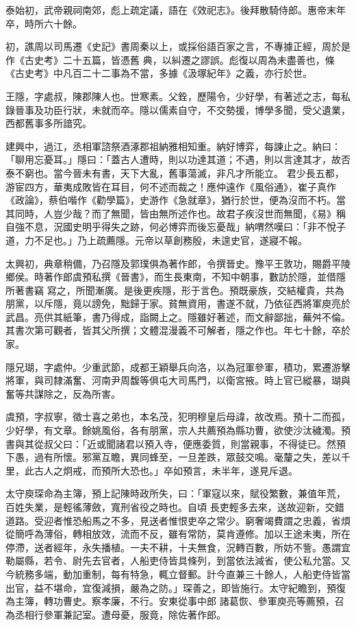 \begin{pinyinscope}
 泰始初，武帝親祠南郊，彪上疏定議，語在《效祀志》。後拜散騎侍郎。惠帝末年卒，時所六十餘。



 初，譙周以司馬遷《史記》書周秦以上，或採俗語百家之言，不專據正經，周於是作《古史考》二十五篇，皆憑舊
 典，以糾遷之謬誤。彪復以周為未盡善也，條《古史考》中凡百二十二事為不當，多據《汲塚紀年》之義，亦行於世。



 王隱，字處叔，陳郡陳人也。世寒素。父銓，歷陽令，少好學，有著述之志，每私錄晉事及功臣行狀，未就而卒。隱以儒素自守，不交勢援，博學多聞，受父遺業，西都舊事多所諳究。



 建興中，過江，丞相軍諮祭酒涿郡祖納雅相知重。納好博弈，每諫止之。納曰：「聊用忘憂耳。」隱曰：「蓋古人遭時，則以功達其道；不遇，則以言達其才，故否泰不窮也。當今晉未有書，天下大亂，舊事蕩滅，非凡才所能立。
 君少長五都，游宦四方，華夷成敗皆在耳目，何不述而裁之！應仲遠作《風俗通》，崔子真作《政論》，蔡伯喈作《勸學篇》，史游作《急就章》，猶行於世，便為沒而不朽。當其同時，人豈少哉？而了無聞，皆由無所述作也。故君子疾沒世而無聞，《易》稱自強不息，況國史明乎得失之跡，何必博弈而後忘憂哉」納喟然嘆曰：「非不悅子道，力不足也。」乃上疏薦隱。元帝以草創務殷，未遑史官，遂寢不報。



 太興初，典章稍備，乃召隱及郭璞俱為著作郎，令撰晉史。豫平王敦功，賜爵平陵鄉侯。時著作郎虞預私撰《晉書》，而生長東南，不知中朝事，數訪於隱，並借隱所著書竊
 寫之，所聞漸廣。是後更疾隱，形于言色。預既豪族，交結權貴，共為朋黨，以斥隱，竟以謗免，黜歸于家。貧無資用，書遂不就，乃依征西將軍庾亮於武昌。亮供其紙筆，書乃得成，詣闕上之。隱雖好著述，而文辭鄙拙，蕪舛不倫。其書次第可觀者，皆其父所撰；文體混漫義不可解者，隱之作也。年七十餘，卒於家。



 隱兄瑚，字處仲。少重武節，成都王穎舉兵向洛，以為冠軍參軍，積功，累遷游擊將軍，與司隸滿奮、河南尹周馥等俱屯大司馬門，以衛宮掖。時上官已縱暴，瑚與奮等共謀除之，反為所害。



 虞預，字叔寧，徵士喜之弟也，本名茂，犯明穆皇后母諱，故改焉。預十二而孤，少好學，有文章。餘姚風俗，各有朋黨，宗人共薦預為縣功曹，欲使沙汰穢濁。預書與其從叔父曰：「近或聞諸君以預入寺，便應委質，則當親事，不得徒已。然預下愚，過有所懷。邪黨互瞻，異同蜂至，一旦差跌，眾鼓交鳴。毫釐之失，差以千里，此古人之炯戒，而預所大恐也。」卒如預言，未半年，遂見斥退。



 太守庾琛命為主簿，預上記陳時政所失，曰：「軍寇以來，賦役繁數，兼值年荒，百姓失業，是輕徭薄斂，寬刑省役之時也。自頃
 長吏輕多去來，送故迎新，交錯道路。受迎者惟恐船馬之不多，見送者惟恨吏卒之常少。窮奢竭費謂之忠義，省煩從簡呼為薄俗，轉相放效，流而不反，雖有常防，莫肯遵修。加以王途未夷，所在停滯，送者經年，永失播植。一夫不耕，十夫無食，況轉百數，所妨不訾。愚謂宜勒屬縣，若令、尉先去官者，人船吏侍皆具條列，到當依法減省，使公私允當。又今統務多端，動加重制，每有特急，輒立督郵。計今直兼三十餘人，人船吏侍皆當出官，益不堪命，宜復減損，嚴為之防。」琛善之，即皆施行。太守紀瞻到，預復為主簿，轉功曹史。察孝廉，不行。安東從事中郎
 諸葛恢、參軍庾亮等薦預，召為丞相行參軍兼記室。遭母憂，服竟，除佐著作郎。




\end{pinyinscope}
